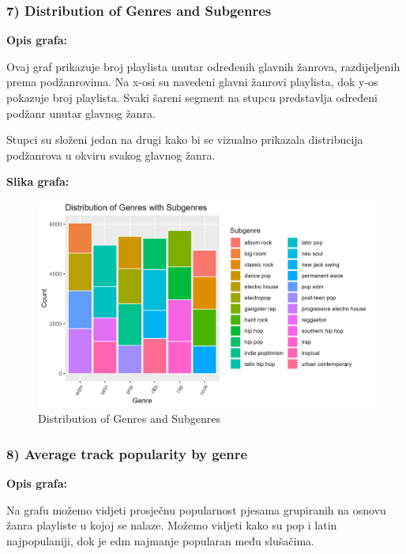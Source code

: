 		\subsubsection{7) Distribution of Genres and Subgenres}
	
	\textbf{Opis grafa:}
	
		Ovaj graf prikazuje broj playlista unutar određenih glavnih žanrova, razdijeljenih prema podžanrovima. Na x-osi su navedeni glavni žanrovi playlista, dok y-os pokazuje broj playlista. Svaki šareni segment na stupcu predstavlja određeni podžanr unutar glavnog žanra.
		
		Stupci su složeni jedan na drugi kako bi se vizualno prikazala distribucija podžanrova u okviru svakog glavnog žanra. 
	
	
	\textbf{Slika grafa:}
	\begin{figure}[H]
		\includegraphics[scale=0.9]{slike/Genre-Subgenre.png}
		\centering
		\caption{Distribution of Genres and Subgenres}
		
	\end{figure}
	
	\subsubsection{8) Average track popularity by genre}
	
	\textbf{Opis grafa:}
	
	Na grafu možemo vidjeti prosječnu popularnost pjesama grupiranih na osnovu žanra playliste u kojoj se nalaze. Možemo vidjeti kako su pop i latin najpopulaniji, dok je edm najmanje popularan među slušačima. 
	

